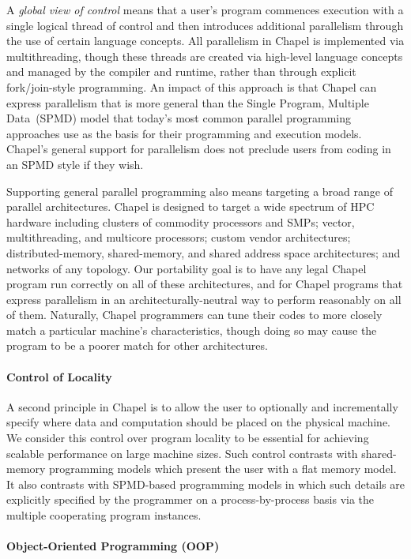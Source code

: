 A \emph{global view of control} means that a user's program commences
execution with a single logical thread of control and then introduces
additional parallelism through the use of certain language concepts.
All parallelism in Chapel is implemented via multithreading, though
these threads are created via high-level language concepts and managed
by the compiler and runtime, rather than through explicit
fork/join-style programming.  An impact of this approach is that
Chapel can express parallelism that is more general than the Single
Program, Multiple Data~(SPMD) model that today's most common parallel
programming approaches use as the basis for their programming and
execution models.  Chapel's general support for parallelism does not
preclude users from coding in an SPMD style if they wish.


Supporting general parallel programming also means targeting a broad
range of parallel architectures.  Chapel is designed to target a wide
spectrum of HPC hardware including clusters of commodity processors
and SMPs; vector, multithreading, and multicore processors; custom
vendor architectures; distributed-memory, shared-memory, and shared
address space architectures; and networks of any topology.  Our
portability goal is to have any legal Chapel program run correctly on
all of these architectures, and for Chapel programs that express
parallelism in an architecturally-neutral way to perform reasonably on
all of them.  Naturally, Chapel programmers can tune their codes to
more closely match a particular machine's characteristics, though
doing so may cause the program to be a poorer match for other
architectures.

\paragraph{Control of Locality}

A second principle in Chapel is to allow the user to optionally and
incrementally specify where data and computation should be placed on
the physical machine.  We consider this control over program locality
to be essential for achieving scalable performance on large machine
sizes.  Such control contrasts with shared-memory programming models
which present the user with a flat memory model.  It also contrasts
with SPMD-based programming models in which such details are
explicitly specified by the programmer on a process-by-process basis
via the multiple cooperating program instances.

\paragraph{Object-Oriented Programming (OOP)}

